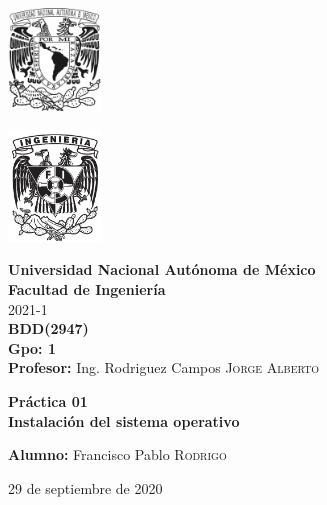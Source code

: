 \documentclass{article}
\newcommand{\materia}{BDD}
\newcommand{\clave}{2947}
\newcommand{\profesor}{Ing. Rodriguez Campos \textsc{Jorge Alberto}}
\newcommand{\semestre}{2021-1}
\newcommand{\alumno}{Francisco Pablo \textsc{Rodrigo}}
\newcommand{\actividad}{Práctica 01}
\newcommand{\titulo}{Instalación del sistema operativo}
\newcommand{\fechaEntrega}{29 de septiembre de 2020}
\begin{document}
\thispagestyle{empty}
\begin{minipage}[t][5cm][t]{0.2\linewidth}
    \includegraphics[width=2.5cm]{unam.jpg}
    \vspace{10cm}

    \includegraphics[width=2.5cm]{fiblack}
\end{minipage}
\begin{minipage}[t]{0.7\linewidth}
    \vspace{-2.5cm}
    \LARGE{\textbf{Universidad Nacional Autónoma de México}}\\
    \Large{\textbf{Facultad de Ingeniería}} \\

    \large{\semestre}\\[2cm]

    \large{\textbf{\materia (\clave)}}\\
    \large{\textbf{Gpo: 1}}\\[5mm]
    \large{\textbf{Profesor:} \profesor}\\ [1.5cm]
    \begin{center}
        \LARGE{\textbf{\actividad}}\\
        \LARGE{\textbf{\titulo}}\\
    \end{center}

    \vspace{3.3cm}

    \large{\textbf{Alumno:} \alumno} \\[1.5cm]

    \begin{flushright}
        \fechaEntrega%
    \end{flushright}
\end{minipage}

\newpage
\end{document}
